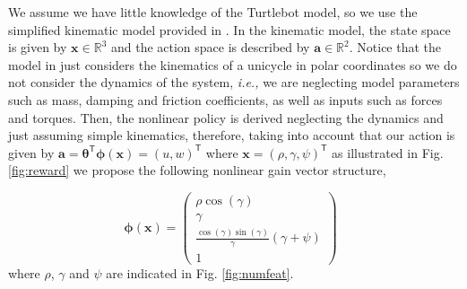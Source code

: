 \documentclass{aamas2016}
\renewcommand{\Re}{\mathbb{R}}
\newcommand{\transpose}{\text{$\mathsf{T}$}}
\begin{document}

We assume we have little knowledge of the Turtlebot model, so we use the simplified kinematic model provided in \cite{aicardi1994closed}.
In the kinematic model, the state space is given by $\boldsymbol{x} \in \Re^3$ and the action space is described by 
$\boldsymbol{a} \in \Re^2$. Notice that the model in \cite{aicardi1994closed} just considers the kinematics of a unicycle in polar coordinates
so we do not consider the dynamics of the system, \emph{i.e.,} we are neglecting model parameters such as mass, damping and friction 
coefficients, as well as inputs such as forces and torques. Then, the nonlinear policy is derived neglecting the dynamics and just assuming
simple kinematics, therefore, taking into account that our action is given by 
$\boldsymbol{a} = \boldsymbol{\theta}^\transpose\boldsymbol{\phi}(\boldsymbol{x}) = (u,w)^\transpose$
where $\boldsymbol{x} = (\rho,\gamma,\psi)^\transpose$ as illustrated in Fig. \ref{fig:reward} we propose the following nonlinear gain vector
structure,

\begin{equation} \label{eqn:state}
	\boldsymbol{\phi}(\boldsymbol{x}) = \left(\begin{array}{c} \rho \cos(\gamma) \\ \gamma \\ \frac{\cos(\gamma)\sin(\gamma)}{\gamma}\left(\gamma + \psi \right) \\ 1 \end{array}\right) \enspace
\end{equation}
where $\rho$, $\gamma$ and $\psi$ are indicated in Fig. \ref{fig:numfeat}.
\end{document}
